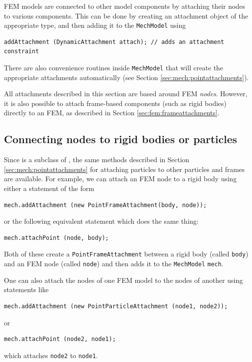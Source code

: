 FEM models are connected to other model components by attaching their
nodes to various components. This can be done by creating
an attachment object of the appropriate type, and then 
adding it to the {\tt MechModel} using
\begin{lstlisting}[]
  addAttachment (DynamicAttachment attach); // adds an attachment constraint
\end{lstlisting}
There are also convenience routines inside {\tt MechModel} that will create
the appropriate attachments automatically (see Section 
\ref{sec:mech:pointattachments}).

All attachments described in this section are based around FEM {\it
nodes}. However, it is also possible to attach frame-based components
(such as rigid bodies) directly to an FEM, as described in
Section \ref{sec:fem:frameattachments}.

\subsection{Connecting nodes to rigid bodies or particles}

Since
 is a subclass of
, the same methods
described in Section \ref{sec:mech:pointattachments} for attaching 
particles to other particles and frames are available. For example, 
we can attach an FEM node to a rigid body using
either a statement of the form
%
\begin{lstlisting}[]
   mech.addAttachment (new PointFrameAttachment(body, node));
\end{lstlisting}
%
or the following equivalent statement which does the same thing:
%
\begin{lstlisting}[]
   mech.attachPoint (node, body);
\end{lstlisting}
%
Both of these create a {\tt PointFrameAttachment} between a rigid body (called
{\tt body}) and an FEM node (called {\tt node}) and then adds it to
the {\tt MechModel} {\tt mech}.

One can also attach the nodes of one FEM model to the nodes of another
using statements like
%
\begin{lstlisting}[]
   mech.addAttachment (new PointParticleAttachment (node1, node2));
\end{lstlisting}
%
or
%
\begin{lstlisting}[]
   mech.attachPoint (node2, node1);
\end{lstlisting}
%
which attaches {\tt node2} to {\tt node1}.

